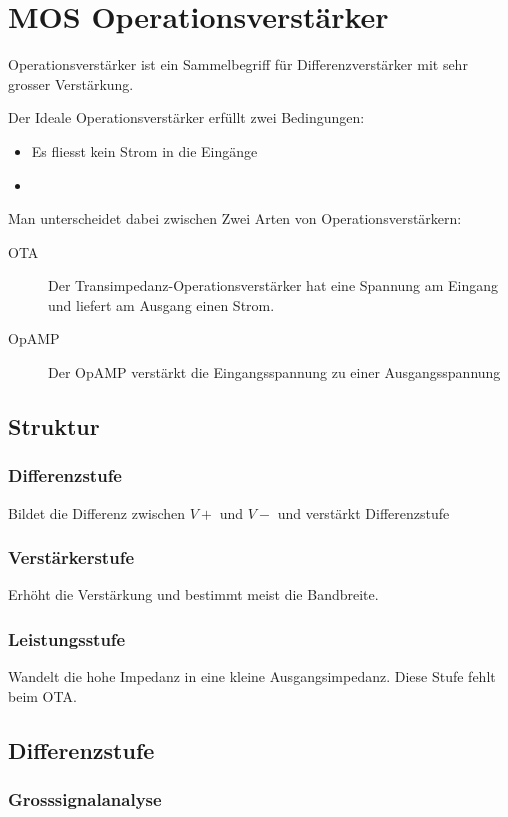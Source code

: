 \section{MOS Operationsverstärker}
Operationsverstärker ist ein Sammelbegriff für Differenzverstärker mit sehr grosser Verstärkung.

Der Ideale Operationsverstärker erfüllt zwei Bedingungen:
\begin{itemize}
    \item Es fliesst kein Strom in die Eingänge
    \item 
\end{itemize}

Man unterscheidet dabei zwischen Zwei Arten von Operationsverstärkern:
\begin{description}
    \item[OTA] Der Transimpedanz-Operationsverstärker hat eine Spannung am Eingang und liefert am Ausgang einen Strom.
    \item[OpAMP] Der OpAMP verstärkt die Eingangsspannung zu einer Ausgangsspannung
\end{description}

\subsection{Struktur}
\subsubsection{Differenzstufe}
Bildet die Differenz zwischen $V+$ und $V-$ und verstärkt Differenzstufe

\subsubsection{Verstärkerstufe}
Erhöht die Verstärkung und bestimmt meist die Bandbreite.

\subsubsection{Leistungsstufe}
Wandelt die hohe Impedanz in eine kleine Ausgangsimpedanz.
Diese Stufe fehlt beim OTA.

\subsection{Differenzstufe}
\subsubsection{Grosssignalanalyse}

